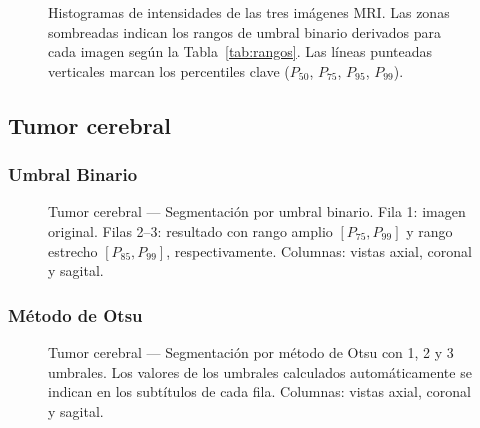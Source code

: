 \documentclass[12pt, a4paper]{article}
\begin{document}
\begin{figure}[H]
  \centering
  \caption{Histogramas de intensidades de las tres imágenes MRI. Las zonas sombreadas
    indican los rangos de umbral binario derivados para cada imagen según la
    Tabla~\ref{tab:rangos}. Las líneas punteadas verticales marcan los percentiles
    clave ($P_{50}$, $P_{75}$, $P_{95}$, $P_{99}$).}
  \label{fig:histogramas}
\end{figure}

\subsection{Tumor cerebral}

\subsubsection{Umbral Binario}

\begin{figure}[H]
  \centering
  \caption{Tumor cerebral — Segmentación por umbral binario. Fila 1: imagen original.
    Filas 2--3: resultado con rango amplio $[P_{75}, P_{99}]$ y rango estrecho
    $[P_{85}, P_{99}]$, respectivamente. Columnas: vistas axial, coronal y sagital.}
  \label{fig:brain_binary}
\end{figure}

\subsubsection{Método de Otsu}

\begin{figure}[H]
  \centering
  \caption{Tumor cerebral — Segmentación por método de Otsu con 1, 2 y 3 umbrales.
    Los valores de los umbrales calculados automáticamente se indican en los subtítulos
    de cada fila. Columnas: vistas axial, coronal y sagital.}
  \label{fig:brain_otsu}
\end{figure}
\end{document}
